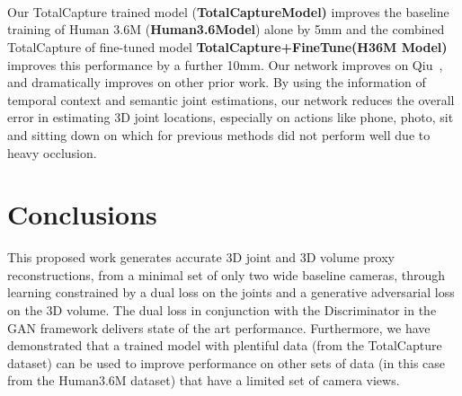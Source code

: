 \documentclass{bmvc2k}
\newcommand{\squeezeup}{\vspace{-2mm}}
\begin{document}
 \\
\\
\\
Our TotalCapture trained model (\textbf{TotalCaptureModel)} improves the baseline training of Human 3.6M (\textbf{Human3.6Model}) alone by 5mm and the combined TotalCapture of fine-tuned model \textbf{TotalCapture+FineTune(H36M Model)} improves this performance by a further 10mm. Our network improves on  Qiu~\cite{Qiu:iccv:2019}, and dramatically improves on other prior work. By using the information of temporal context and semantic joint estimations, our network reduces the overall error in estimating 3D joint locations, especially on actions like phone, photo, sit and sitting down on which for previous methods did not perform well due to heavy occlusion. 
\squeezeup
\squeezeup





\section{Conclusions}
This proposed work generates accurate 3D joint and 3D volume proxy reconstructions, from a minimal set of only two wide baseline cameras, through learning constrained by a dual loss on the joints and a generative adversarial loss on the 3D volume. The dual loss in conjunction with the Discriminator in the GAN framework delivers state of the art performance. Furthermore, we have demonstrated that a trained model with plentiful data (from the TotalCapture dataset) can be used to improve performance on other sets of data (in this case from the Human3.6M dataset) that have a limited set of camera views. 
\end{document}
